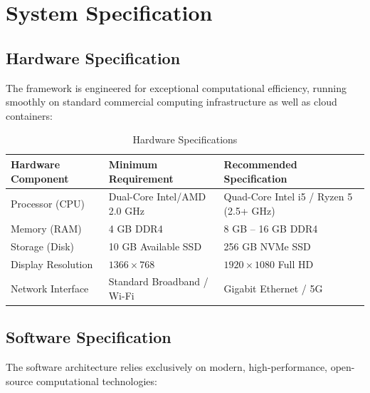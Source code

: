\documentclass[12pt,a4paper]{report}
\begin{document}
\section{System Specification}

\subsection{Hardware Specification}
The framework is engineered for exceptional computational efficiency, running smoothly on standard commercial computing infrastructure as well as cloud containers:

\begin{table}[h!]
\centering
\caption{Hardware Specifications}
\label{tab:hardware}
\begin{tabular}{lll}
\toprule
\textbf{Hardware Component} & \textbf{Minimum Requirement} & \textbf{Recommended Specification} \\
\midrule
Processor (CPU) & Dual-Core Intel/AMD 2.0 GHz & Quad-Core Intel i5 / Ryzen 5 (2.5+ GHz) \\
Memory (RAM) & 4 GB DDR4 & 8 GB -- 16 GB DDR4 \\
Storage (Disk) & 10 GB Available SSD & 256 GB NVMe SSD \\
Display Resolution & $1366 \times 768$ & $1920 \times 1080$ Full HD \\
Network Interface & Standard Broadband / Wi-Fi & Gigabit Ethernet / 5G \\
\bottomrule
\end{tabular}
\end{table}

\subsection{Software Specification}
The software architecture relies exclusively on modern, high-performance, open-source computational technologies:
\end{document}

